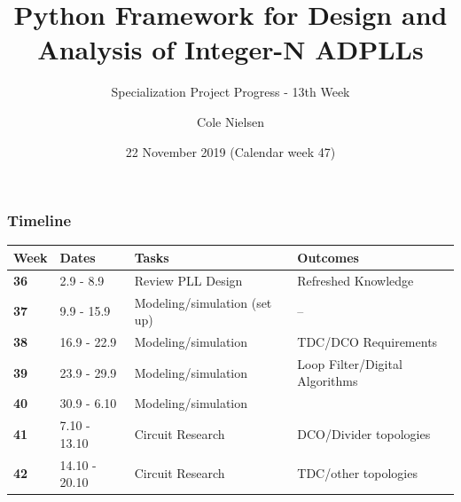 \documentclass[t, screen, aspectratio=43]{beamer}
\title[Short title]{Python Framework for Design and Analysis of Integer-N ADPLLs}
\subtitle{Specialization Project Progress - 13th Week}
\author[C Nielsen]{Cole Nielsen}
\institute[NTNU]{Department of Electronic Systems, NTNU}
\date{22 November 2019 (Calendar week 47)}
\begin{document}
\begin{frame}
	\titlepage%
\end{frame}



\begin{frame}
	\frametitle{Timeline}
	\begin{table}[htb!]
		\tiny
		\centering
		\vspace{-1em}
		\def\arraystretch{1.5}		
		\setlength\arrayrulewidth{0.75pt}
		\setlength{\tabcolsep}{1em} %
		\begin{tabular}{|l|l|l|l|}
			\hline 
			\rule[-1ex]{0pt}{2.5ex} \cellcolor{gray!40}\textbf{Week} & \cellcolor{gray!40}\textbf{Dates} &\cellcolor{gray!40}\textbf{Tasks} & \cellcolor{gray!40}\textbf{Outcomes}\\ 
			\hline 
			\rule[-1ex]{0pt}{2.5ex} \cellcolor{red!20}\textbf{36}& \cellcolor{red!20}2.9 - 8.9 & \cellcolor{red!20}Review PLL Design & \cellcolor{red!20}Refreshed Knowledge\\ 
			\hline 
			\rule[-1ex]{0pt}{2.5ex} \cellcolor{red!20}\textbf{37}& \cellcolor{red!20}9.9 - 15.9 & \cellcolor{red!20}Modeling/simulation (set up) & \cellcolor{red!20}--\\ 
			\hline 
			\rule[-1ex]{0pt}{2.5ex} \cellcolor{red!20}\textbf{38}& \cellcolor{red!20}16.9 - 22.9 & \cellcolor{red!20}Modeling/simulation &\cellcolor{red!20}TDC/DCO Requirements\\ 
			\hline 
			\rule[-1ex]{0pt}{2.5ex} \cellcolor{red!20}\textbf{39}& \cellcolor{red!20}23.9 - 29.9& \cellcolor{red!20}Modeling/simulation& \cellcolor{red!20}Loop Filter/Digital Algorithms\\ 
			\hline 
			\rule[-1ex]{0pt}{2.5ex} \cellcolor{red!20}\textbf{40}& \cellcolor{red!20}30.9 - 6.10& \cellcolor{red!20}Modeling/simulation& \cellcolor{red!20}{Loop filter, DCO, TDC, calibration}\color{black}\\ 
			\hline 
			\rule[-1ex]{0pt}{2.5ex} \cellcolor{red!20}\textbf{41}&\cellcolor{red!20}7.10 - 13.10&\cellcolor{red!20}Circuit Research &\cellcolor{red!20}DCO/Divider topologies\\ 
			\hline 
			\rule[-1ex]{0pt}{2.5ex} \cellcolor{red!20}\textbf{42}&\cellcolor{red!20}14.10 - 20.10&\cellcolor{red!20}Circuit Research &\cellcolor{red!20}TDC/other topologies\\ 

\end{tabular}
\end{table}
\end{frame}
\end{document}
